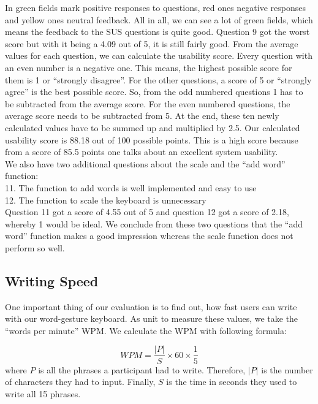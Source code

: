 In  green fields mark positive responses to questions, red ones negative responses and yellow ones neutral feedback. All in all, we can see a lot of green fields, which means the feedback to the SUS questions is quite good. Question 9 got the worst score but with it being a 4.09 out of 5, it is still fairly good. From the average values for each question, we can calculate the usability score. Every question with an even number is a negative one. This means, the highest possible score for them is 1 or ``strongly disagree''. For the other questions, a score of 5 or ``strongly agree'' is the best possible score. So, from the odd numbered questions 1 has to be subtracted from the average score. For the even numbered questions, the average score needs to be subtracted from 5. At the end, these ten newly calculated values have to be summed up and multiplied by 2.5. Our calculated usability score is 88.18 out of 100 possible points. This is a high score because from a score of 85.5 points one talks about an excellent system usability.\\

We also have two additional questions about the scale and the ``add word'' function:\\
11. The function to add words is well implemented and easy to use\\
12. The function to scale the keyboard is unnecessary\\
Question 11 got a score of 4.55 out of 5 and question 12 got a score of 2.18, whereby 1 would be ideal. We conclude from these two questions that the ``add word'' function makes a good impression whereas the scale function does not perform so well.\\

\subsection{Writing Speed}
One important thing of our evaluation is to find out, how fast users can write with our word-gesture keyboard. As unit to measure these values, we take the ``words per minute'' WPM. We calculate the WPM with following formula: 

\begin{equation}
    WPM = \frac{\lvert P \rvert}{S} \times 60 \times \frac{1}{5}
\end{equation}
where $P$ is all the phrases a participant had to write. Therefore, $\lvert P \rvert$ is the number of characters they had to input. Finally, $S$ is the time in seconds they used to write all 15 phrases.\\

